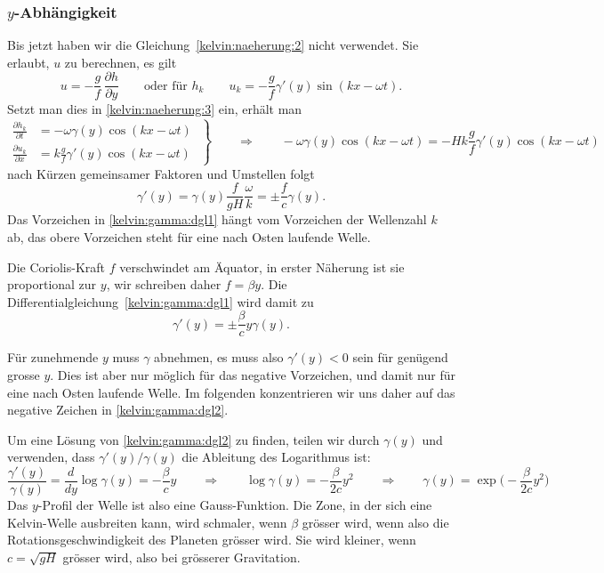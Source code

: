 \subsubsection{$y$-Abhängigkeit}
Bis jetzt haben wir die Gleichung~\eqref{kelvin:naeherung:2} nicht
verwendet.
Sie erlaubt, $u$ zu berechnen, es gilt
\[
u=-\frac{g}{f}\,\frac{\partial h}{\partial y}
\qquad
\text{oder für $h_k$}
\qquad
u_k=-\frac{g}{f} \gamma'(y) \sin(kx-\omega t).
\]
Setzt man dies in \eqref{kelvin:naeherung:3} ein, erhält man
\begin{equation}
\left.
\begin{aligned}
\frac{\partial h_k}{\partial t}
&=
-\omega
\gamma(y) \cos(kx-\omega t)
\\
\frac{\partial u_k}{\partial x}
&=
k \frac{g}{f}\gamma'(y) \cos(kx-\omega t)
\end{aligned}
\;\right\}
\qquad\Rightarrow\qquad
-\omega
\gamma(y) \cos(kx-\omega t)
=
-H
k \frac{g}{f}\gamma'(y) \cos(kx-\omega t)
\end{equation}
nach Kürzen gemeinsamer Faktoren und Umstellen folgt
\begin{equation}
\gamma'(y)
=
\gamma(y) \frac{f}{gH}\frac{\omega}{k}
=
\pm
\frac{f}{c} \gamma(y).
\label{kelvin:gamma:dgl1}
\end{equation}
Das Vorzeichen in \eqref{kelvin:gamma:dgl1} hängt vom Vorzeichen der
Wellenzahl $k$ ab, das obere Vorzeichen steht für eine nach Osten
laufende Welle.

Die Coriolis-Kraft $f$ verschwindet am Äquator, in erster Näherung
ist sie proportional zur $y$, wir schreiben daher $f=\beta y$.
Die Differentialgleichung~\eqref{kelvin:gamma:dgl1} wird damit zu
\begin{equation}
\gamma'(y)
=
\pm
\frac{\beta}{c} 
y\gamma(y).
\label{kelvin:gamma:dgl2}
\end{equation}

Für zunehmende $y$ muss $\gamma$ abnehmen, es muss also $\gamma'(y)<0$ sein
für genügend grosse $y$.
Dies ist aber nur möglich für das negative Vorzeichen, und damit nur
für eine nach Osten laufende Welle.
Im folgenden konzentrieren wir uns daher auf das negative Zeichen
in \eqref{kelvin:gamma:dgl2}.

Um eine Lösung von \eqref{kelvin:gamma:dgl2} zu finden, teilen wir
durch $\gamma(y)$
und verwenden, dass $\gamma'(y)/\gamma(y)$ die Ableitung des
Logarithmus ist:
\begin{equation}
\frac{\gamma'(y)}{\gamma(y)}
=
\frac{d}{dy}\log \gamma(y) = -\frac{\beta}{c} y
\qquad\Rightarrow\qquad
\log\gamma(y) = -\frac{\beta}{2c}y^2
\qquad\Rightarrow\qquad
\gamma(y) = \exp\biggl(
- \frac{\beta}{2c}y^2
\biggr)
\end{equation}
Das $y$-Profil der Welle ist also eine Gauss-Funktion.
Die Zone, in der sich eine Kelvin-Welle ausbreiten kann, 
wird schmaler, wenn $\beta$ grösser wird, wenn also die 
Rotationsgeschwindigkeit des Planeten grösser wird.
Sie wird kleiner, wenn $c=\sqrt{gH}$ grösser wird, also
bei grösserer Gravitation.

